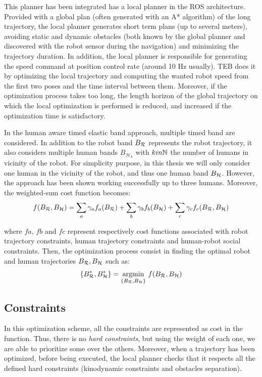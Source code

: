 \documentclass[a4paper,11pt,twoside]{StyleThese}
\begin{document}
This planner has been integrated has a local planner in the ROS architecture. Provided with a global plan (often generated with an A* algorithm) of the long trajectory, the local planner generates short term plans (up to several meters), avoiding static and dynamic obstacles (both known by the global planner and discovered with the robot sensor during the navigation) and minimizing the trajectory duration. In addition, the local planner is responsible for generating the speed command at position control rate (around 10 Hz usually). TEB does it by optimizing the local trajectory and computing the wanted robot speed from the first two poses and the time interval between them. Moreover, if the optimization process takes too long, the length horizon of the global trajectory on which the local optimization is performed is reduced, and increased if the optimization time is satisfactory.

In the human aware timed elastic band approach, multiple timed band are considered. In addition to the robot band $B_\mathcal{R}$ represents the robot trajectory, it also considers multiple human bands $B_{\mathcal{H}_k}$ with $k in \mathbb{N}$ the number of humans in vicinity of the robot. For simplicity purpose, in this thesis we will only consider one human in the vicinity of the robot, and thus one human band $B_\mathcal{H}$. However, the approach has been shown working successfully up to three humans.
Moreover, the weighted-sum cost function becomes:
\[f(B_\mathcal{R}, B_\mathcal{H}) = \sum_a \gamma_a f_a(B_\mathcal{R}) + \sum_b \gamma_b f_b(B_\mathcal{H}) + \sum_c \gamma_c f_c(B_\mathcal{R}, B_\mathcal{H}) \]

where $fa$, $fb$ and $fc$ represent respectively cost functions associated with robot trajectory constraints, human trajectory constraints and human-robot social constraints. Then, the optimization process consist in finding the optimal robot and human trajectories $B_\mathcal{R}, B_\mathcal{H}$ such as:
\[\{B_\mathcal{R}^*, B_\mathcal{H}^*\} = \mathop{\mathrm{argmin}}_{\{B_\mathcal{R}, B_\mathcal{H}\}}\,f(B_\mathcal{R}, B_\mathcal{H})\]





\subsection{Constraints}
In this optimization scheme, all the constraints are represented as cost in the function. Thus, there is no \textit{hard constraints}, but using the weight of each one, we are able to prioritize some over the others. Moreover, when a trajectory has been optimized, before being executed, the local planner checks that it respects all the defined hard constraints (kinodynamic constraints and obstacles separation).
\end{document}
